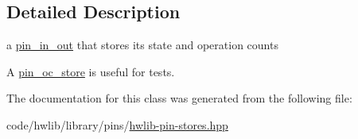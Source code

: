 \subsection{Detailed Description}
a \hyperlink{classhwlib_1_1pin__in__out}{pin\+\_\+in\+\_\+out} that stores its state and operation counts

A \hyperlink{classhwlib_1_1pin__oc__store}{pin\+\_\+oc\+\_\+store} is useful for tests. 

The documentation for this class was generated from the following file\+:\begin{DoxyCompactItemize}
\item 
code/hwlib/library/pins/\hyperlink{hwlib-pin-stores_8hpp}{hwlib-\/pin-\/stores.\+hpp}\end{DoxyCompactItemize}

